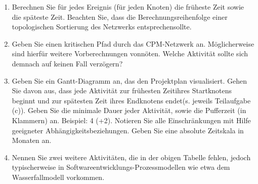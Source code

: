 \documentclass{lehramt-informatik-aufgabe}
\begin{document}
\begin{enumerate}

\item Berechnen Sie für jedes Ereignis (\dh für jeden Knoten) die
früheste Zeit sowie die späteste Zeit. Beachten Sie, dass die
Berechnungsreihenfolge einer topologischen Sortierung des Netzwerks
entsprechensollte.


\item Geben Sie einen kritischen Pfad durch das CPM-Netzwerk an.
Möglicherweise sind hierfür weitere Vorberechnungen vonnöten. Welche
Aktivität sollte sich demnach auf keinen Fall verzögern?


\item Geben Sie ein Gantt-Diagramm an, das den Projektplan visualisiert.
Gehen Sie davon aus, dass jede Aktivität zur frühesten Zeitihres
Startknotens beginnt und zur spätesten Zeit ihres Endknotens endet(s.
jeweils Teilaufgabe (c)). Geben Sie die minimale Dauer jeder Aktivität,
sowie die Pufferzeit (in Klammern) an. Beispiel: 4 (+2). Notieren Sie
alle Einschränkungen mit Hilfe geeigneter Abhängigkeitsbeziehungen.
Geben Sie eine absolute Zeitskala in Monaten an.


\item Nennen Sie zwei weitere Aktivitäten, die in der obigen Tabelle
fehlen, jedoch typischerweise in Softwareentwicklungs-Prozessmodellen
wie etwa dem Wasserfallmodell vorkommen.
\end{enumerate}
\end{document}
